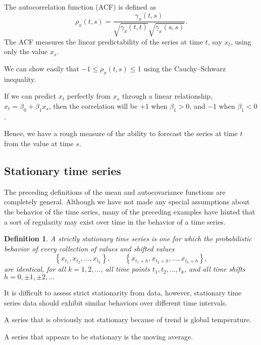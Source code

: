 \documentclass[
paper=128mm:96mm, %
fontsize=9.5pt, %
pagesize, %
parskip=half-, %
]{scrartcl} %
\theoremstyle{mythmstyle} %
\newtheorem{definition}[theorem]{Definition} %
\begin{document}
The autocorrelation function (ACF) is defined as
\begin{equation}
\label{eq:acf_def}
\rho_{x}\left(t,s\right)=\frac{\gamma_{x}\left(t,s\right)}{\sqrt{\gamma_{x}\left(t,t\right)}\sqrt{\gamma_{x}\left(s,s\right)}}.
\end{equation}
%
The ACF measures the linear predictability of the series at time $t$, say $x_t$, using only the value $x_s$. 

We can show easily that $-1 \leq\rho_{x}\left(t,s\right) \leq 1$ using the Cauchy--Schwarz inequality.

If we can predict $x_t$ perfectly from $x_s$ through a linear relationship, $x_t = \beta_0 + \beta_1x_s$, then the correlation will be $+1$ when
$\beta_1> 0$, and $-1$ when $\beta_1<0$. 

Hence, we have a rough measure of the ability to forecast the series at time $t$ from the value at time $s$.
\clearpage

\subsection{Stationary time series}

The preceding definitions of the mean and autocovariance functions are completely general. Although we have not made any special assumptions about the behavior of the time series, many of the preceding examples have hinted that a sort of regularity may exist over time in the behavior of a time series.

\begin{definition}
A strictly stationary time series is one for which the probabilistic behavior of every collection of values and shifted values
\begin{equation}
\left\{x_{t_1},x_{t_2},\dots,x_{t_k}\right\},\qquad\left\{x_{t_1+h},x_{t_2+h},\dots,x_{t_k+h}\right\},
\end{equation}
%
are identical, for all $k = 1, 2, \dots$, all time points $t_1, t_2, \dots , t_k$, and all time shifts
$h = 0,\pm1,\pm2,\dots$
\end{definition}
\clearpage

It is difficult to assess strict stationarity from data, however, stationary time series data should exhibit similar behaviors over different time intervals. 

A series that is obviously not stationary because of trend is global temperature.

 A series that appears to be stationary is the moving average. 
 
\end{document}
